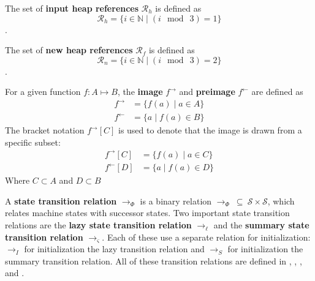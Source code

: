 \begin{definition}
The set of \textbf{input heap references} $\mathcal{R}_h$ is defined as
 $$\mathcal{R}_h =\{i \in \mathbb{N} \mid ( i\ \bmod\ 3 ) = 1\}$$. 
\end{definition}

\begin{definition}
The set of \textbf{new heap references} $\mathcal{R}_f$ is defined as
 $$\mathcal{R}_n =\{i \in \mathbb{N} \mid ( i\ \bmod\ 3 ) = 2\}$$. 
\end{definition}

\begin{definition}
For a given function $f:A \mapsto B$, the \textbf{image} $f^\rightarrow$ and \textbf{preimage} $f^\leftarrow$ are defined as
\begin{align}
 f^\rightarrow &= \{ f(a) \mid a \in A\}\\
 f^\leftarrow &= \{ a \mid f(a) \in B \}
 \end{align}
 The bracket notation $ f^\rightarrow [C] $ is used to denote that the image is drawn from a specific subset:
 \begin{align}
 f^\rightarrow [C] &= \{ f(a) \mid a \in C\}\\
 f^\leftarrow [D] &= \{ a \mid f(a) \in D \}
 \end{align}
 Where $C \subset A$ and $D \subset B$
\end{definition}

\begin{definition}
A \textbf{state transition relation} $\rightarrow_{\Phi}$ is a binary relation $\rightarrow_{\Phi}\ \subseteq\ \mathcal{S} \times \mathcal{S} $, which relates machine states with successor states. Two important state transition relations are the \textbf{lazy state transition relation} $\rightarrow_\ell$ and the \textbf{summary state transition relation} $\rightarrow_\varsigma$. Each of these use a separate relation for initialization: $\rightarrow_I$ for initialization the lazy transition relation and $\rightarrow_S$ for initialization the summary transition relation. All of these transition relations are defined in , , , and .
\end{definition}

%

